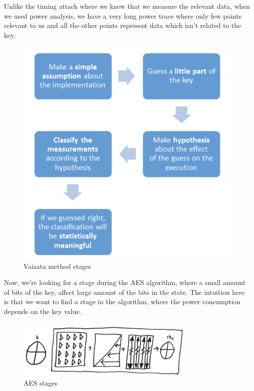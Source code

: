 Unlike the timing attack where we knew that we measure the relevant data, when
we used power analysis, we have a very long power trace where only few points
relevant to us and all the other points represent data which isn't related to
the key.

\begin{figure}[!ht]
    \centering
    \includegraphics[height=0.9\textwidth]{images/Lecture6/vaizata.png}
    \caption{Vaizata method stages} \label{fig:vaizata}
\end{figure}

Now, we're looking for a stage during the AES algorithm, where a small amount of
bits of the key, affect large amount of the bits in the state. The intuition
here is that we want to find a stage in the algorithm, where the power
consumption depends on the key value.

\begin{figure}[!ht]
    \centering
    \includegraphics[width=0.8\textwidth]{images/Lecture6/AES-stages-figure.png}
    \caption{AES stages} \label{fig:aes-stages}
\end{figure}

